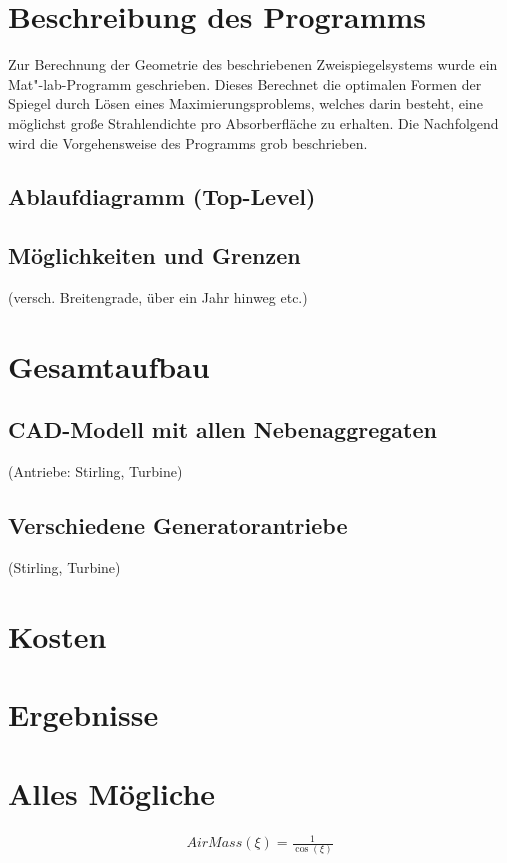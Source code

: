 \documentclass[fontsize=10pt,paper=a4,bibliography=totoc]{scrartcl}
\newcommand{\maxim}[1]{{ \color{blue} #1}}
\begin{document}
\section{Beschreibung des Programms}
\maxim{
Zur Berechnung der Geometrie des beschriebenen Zweispiegelsystems wurde ein Mat"-lab-Programm geschrieben. Dieses Berechnet die optimalen Formen der Spiegel durch Lösen eines Maximierungsproblems, welches darin besteht, eine möglichst große Strahlendichte pro Absorberfläche zu erhalten. Die 
Nachfolgend wird die Vorgehensweise des Programms grob beschrieben.
}
\subsection{Ablaufdiagramm (Top-Level)}
\maxim{

}
\subsection{Möglichkeiten und Grenzen}
 (versch. Breitengrade, über ein Jahr hinweg etc.)
\section{Gesamtaufbau}
\subsection{CAD-Modell mit allen Nebenaggregaten}
 (Antriebe: Stirling, Turbine)
\subsection{Verschiedene Generatorantriebe}
 (Stirling, Turbine)
\section{Kosten}
\section{Ergebnisse}


\section{Alles Mögliche}

\begin{align*}
	AirMass(\xi)=\frac{1}{\cos(\xi)}
\end{align*}
\end{document}
